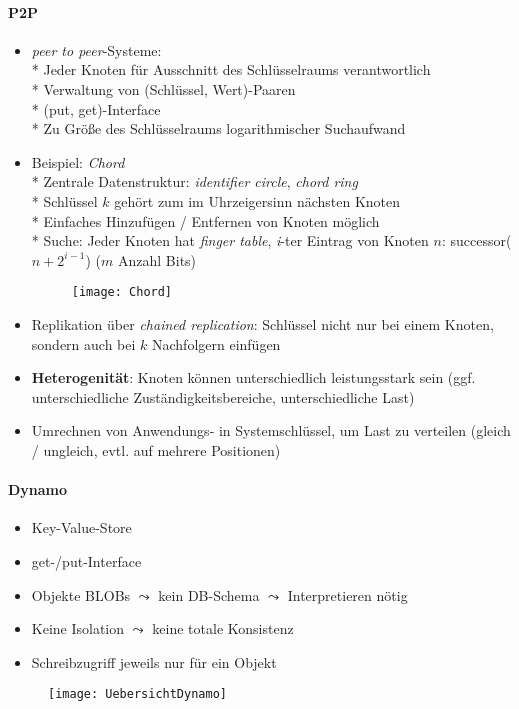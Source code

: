 \paragraph{P2P}
\begin{itemize}
	\item \emph{peer to peer}-Systeme:
		\\*
		Jeder Knoten für Ausschnitt des Schlüsselraums verantwortlich
		\\*
		Verwaltung von (Schlüssel, Wert)-Paaren
		\\*
		(put, get)-Interface
		\\*
		Zu Größe des Schlüsselraums logarithmischer Suchaufwand
	\item Beispiel: \emph{Chord} \\*
		Zentrale Datenstruktur: \emph{identifier circle}, \emph{chord ring}\\*
		Schlüssel $k$ gehört zum im Uhrzeigersinn nächsten Knoten\\*
		Einfaches Hinzufügen / Entfernen von Knoten möglich
		\\* Suche: Jeder Knoten hat \emph{finger table}, \emph{i}-ter Eintrag von Knoten \( n \): successor(\( n+2^{i-1} \)) (\( m \) Anzahl Bits)
	\begin{figure}[H]\centering\label{Chord}\texttt{[image: Chord]}\end{figure}
	\item Replikation über \emph{chained replication}: Schlüssel nicht nur bei einem Knoten, sondern auch bei \( k \) Nachfolgern einfügen
	\item \textbf{Heterogenität}: Knoten können unterschiedlich leistungsstark sein (ggf. unterschiedliche Zuständigkeitsbereiche, unterschiedliche Last)
	\item Umrechnen von Anwendungs- in Systemschlüssel, um Last zu verteilen (gleich / ungleich, evtl. auf mehrere Positionen)
\end{itemize}

\paragraph{Dynamo}
\begin{itemize}
	\item Key-Value-Store
	\item get-/put-Interface
	\item Objekte BLOBs \( \leadsto \) kein DB-Schema \( \leadsto \) Interpretieren nötig
	\item Keine Isolation \( \leadsto \) keine totale Konsistenz
	\item Schreibzugriff jeweils nur für ein Objekt
\end{itemize}
\begin{figure}[H]\centering\label{UebersichtDynamo}\texttt{[image: UebersichtDynamo]}\end{figure}

